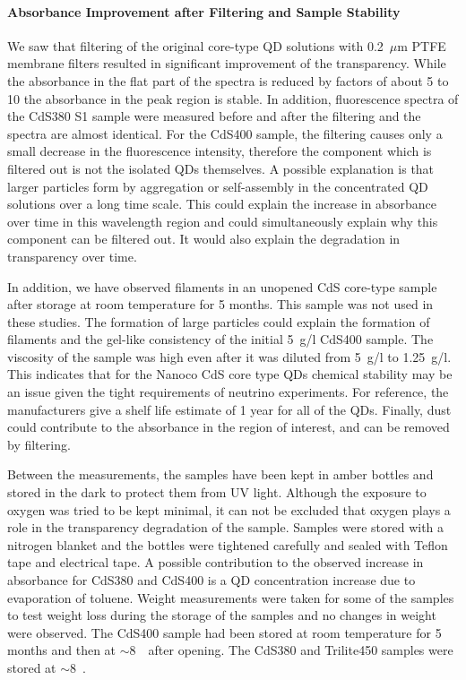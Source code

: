 \documentclass[cits]{JINST}
\begin{document}
\paragraph{Absorbance Improvement after Filtering and Sample Stability}
We saw that filtering of the original core-type QD solutions with 0.2~$\mu$m PTFE membrane filters resulted in significant improvement of the transparency. While the absorbance in the flat part of the spectra is reduced by factors of about 5 to 10 the absorbance in the peak region is stable. In addition, fluorescence spectra of the CdS380 S1 sample were measured before and after the filtering and the spectra are almost identical. For the CdS400 sample, the filtering causes only a small decrease in the fluorescence intensity, therefore the component which is filtered out is not the isolated QDs themselves. A possible explanation is that larger particles form by aggregation or self-assembly in the concentrated QD solutions over a long time scale. This could explain the increase in absorbance over time in this wavelength region and could simultaneously explain why this component can be filtered out. It would also explain the degradation in transparency over time. 

In addition, we have observed filaments in an unopened CdS core-type sample after storage at room temperature for 5 months. This sample was not used in these studies. The formation of large particles could explain the formation of filaments and the gel-like consistency of the initial 5~g/l CdS400 sample. The viscosity of the sample was high even after it was diluted from 5~g/l to 1.25~g/l. This indicates that for the Nanoco CdS core type QDs chemical stability may be an issue given the tight requirements of neutrino experiments. For reference, the manufacturers give a shelf life estimate of 1 year for all of the QDs. Finally, dust could contribute to the absorbance in the region of interest, and can be removed by filtering.  

Between the measurements, the samples have been kept in amber bottles and stored in the dark to protect them from UV light. Although the exposure to oxygen was tried to be kept minimal, it can not be excluded that oxygen plays a role in the transparency degradation of the sample. Samples were stored with a nitrogen blanket and the bottles were tightened carefully and sealed with Teflon tape and electrical tape. A possible contribution to the observed increase in absorbance for CdS380 and CdS400 is a QD concentration increase due to evaporation of toluene. Weight measurements were taken for some of the samples to test weight loss during the storage of the samples and no changes in weight were observed. The CdS400 sample had been stored at room temperature for 5 months and then at $\sim$8~\textcelsius~after opening. The CdS380 and Trilite450 samples were stored at $\sim$8~\textcelsius.
\end{document}

